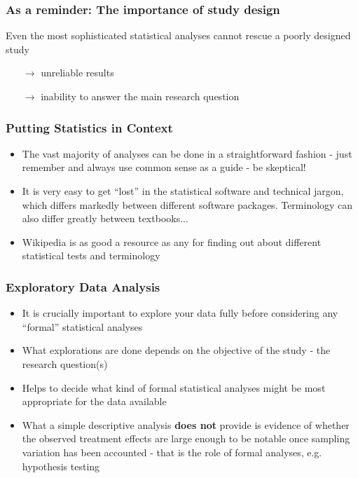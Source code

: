 \documentclass{beamer}\usepackage[]{graphicx}\usepackage[]{color}
\begin{document}
{{{%

\begin{frame}
\frametitle{As a reminder: The importance of study design}
Even the most sophisticated statistical analyses cannot rescue a poorly
designed study
\begin{itemize}
\setlength\itemsep{1.5em}
\item[$\rightarrow$] unreliable results
\item[$\rightarrow$] inability to answer the main research question
\end{itemize}
\vspace{0.5cm}
\end{frame}


\begin{frame}
\frametitle{Putting Statistics in Context}
\begin{itemize}
\setlength\itemsep{1.5em}
\item The vast majority of analyses can be done in a straightforward fashion -
just remember and always use common sense as a guide - be skeptical!
\item It is very easy to get ``lost'' in the statistical software and technical
jargon, which differs markedly between different software packages. Terminology
can also differ greatly between textbooks...
\item Wikipedia is as good a resource as any for finding out about different
statistical tests and terminology
\end{itemize}
\end{frame}


\begin{frame}
\frametitle{Exploratory Data Analysis}
\begin{itemize}
\item It is crucially important to explore your data fully before considering any
``formal'' statistical analyses\pause
\item What explorations are done depends on the objective of the study - the
research question(s)\pause
\item Helps to decide what kind of formal statistical analyses might be most
appropriate for the data available\pause
\item What a simple descriptive analysis {\bfseries does not} provide is evidence
of whether the observed treatment effects are large enough to be notable once
sampling variation has been accounted - that is the role of formal analyses,
e.g. hypothesis testing
\end{itemize}
\end{frame}

}}}
\end{document}
